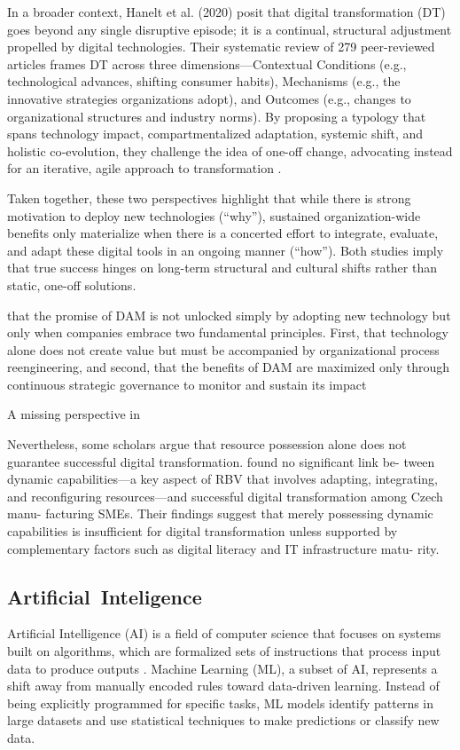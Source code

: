 \documentclass[a4paper,10pt,twocolumn]{article}
\numberwithin{figure}{section}
\numberwithin{table}{section}
\begin{document}
 In a broader context, Hanelt et al. (2020) posit that digital transformation (DT) goes beyond 
any single disruptive episode; it is a continual, structural adjustment propelled by digital 
technologies. Their systematic review of 279 peer-reviewed articles frames DT across three 
dimensions—Contextual Conditions (e.g., technological advances, shifting consumer habits), 
Mechanisms (e.g., the innovative strategies organizations adopt), and Outcomes 
(e.g., changes to organizational structures and industry norms). By proposing 
a typology that spans technology impact, compartmentalized adaptation, systemic 
shift, and holistic co‐evolution, they challenge the idea of one-off change, 
advocating instead for an iterative, agile approach to transformation \citep{Haneltarticle}.

Taken together, these two perspectives highlight that while there is strong motivation to 
deploy new technologies (“why”), sustained organization-wide benefits only materialize 
when there is a concerted effort to integrate, evaluate, and adapt these digital tools 
in an ongoing manner (“how”). Both studies imply that true success hinges on long-term 
structural and cultural shifts rather than static, one-off solutions.

\vspace{0.3cm}

that the promise of DAM
is not unlocked simply by adopting new technology but only when companies embrace two 
fundamental principles. First, that technology alone does not create value but must be accompanied by 
organizational process reengineering, and second, that the benefits of DAM 
are maximized only through continuous strategic governance to monitor and sustain its impact 


A missing perspective in

Nevertheless, some scholars argue that
resource possession alone does not guarantee successful 
digital transformation. 
\cite{Civelek2023} found no significant link be-
tween dynamic capabilities—a key aspect
of RBV that involves adapting, integrating,
and reconfiguring resources—and successful
digital transformation among Czech manu-
facturing SMEs. Their findings suggest that
merely possessing dynamic capabilities is
insufficient for digital transformation unless
supported by complementary factors such as
digital literacy and IT infrastructure matu-
rity.


\subsection{\mbox{Artificial Inteligence}}
Artificial Intelligence (AI) is a field of computer science 
that focuses on systems built on algorithms, 
which are formalized sets of instructions that 
process input data to produce outputs \citep{10589380}. 
Machine Learning (ML), a subset of AI, represents a shift away 
from manually encoded rules toward data-driven learning. 
Instead of being explicitly programmed for specific tasks, 
ML models identify patterns in large datasets and 
use statistical techniques to make predictions or classify new data.
\end{document}
